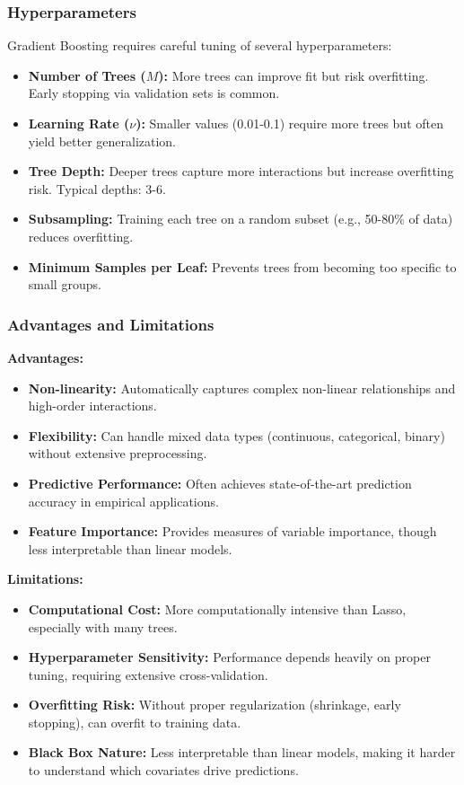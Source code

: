 \documentclass[12pt,a4paper]{article}
\begin{document}
\subsubsection{Hyperparameters}

Gradient Boosting requires careful tuning of several hyperparameters:

\begin{itemize}
\item \textbf{Number of Trees ($M$):} More trees can improve fit but risk overfitting. Early stopping via validation sets is common.
\item \textbf{Learning Rate ($\nu$):} Smaller values (0.01-0.1) require more trees but often yield better generalization.
\item \textbf{Tree Depth:} Deeper trees capture more interactions but increase overfitting risk. Typical depths: 3-6.
\item \textbf{Subsampling:} Training each tree on a random subset (e.g., 50-80\% of data) reduces overfitting.
\item \textbf{Minimum Samples per Leaf:} Prevents trees from becoming too specific to small groups.
\end{itemize}

\subsubsection{Advantages and Limitations}

\textbf{Advantages:}
\begin{itemize}
\item \textbf{Non-linearity:} Automatically captures complex non-linear relationships and high-order interactions.
\item \textbf{Flexibility:} Can handle mixed data types (continuous, categorical, binary) without extensive preprocessing.
\item \textbf{Predictive Performance:} Often achieves state-of-the-art prediction accuracy in empirical applications.
\item \textbf{Feature Importance:} Provides measures of variable importance, though less interpretable than linear models.
\end{itemize}

\textbf{Limitations:}
\begin{itemize}
\item \textbf{Computational Cost:} More computationally intensive than Lasso, especially with many trees.
\item \textbf{Hyperparameter Sensitivity:} Performance depends heavily on proper tuning, requiring extensive cross-validation.
\item \textbf{Overfitting Risk:} Without proper regularization (shrinkage, early stopping), can overfit to training data.
\item \textbf{Black Box Nature:} Less interpretable than linear models, making it harder to understand which covariates drive predictions.
\end{itemize}
\end{document}
